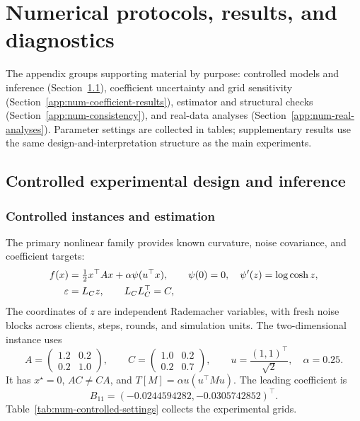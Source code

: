 \section{Numerical protocols, results, and diagnostics}
\label{app:num-details}

The appendix groups supporting material by purpose: controlled models and
inference (Section~\ref{app:num-design}), coefficient uncertainty and
grid sensitivity (Section~\ref{app:num-coefficient-results}), estimator
and structural checks (Section~\ref{app:num-consistency}), and real-data
analyses (Section~\ref{app:num-real-analyses}). Parameter settings are
collected in tables; supplementary results use the same design-and-interpretation
structure as the main experiments.

\subsection{Controlled experimental design and inference}
\label{app:num-design}

\subsubsection{Controlled instances and estimation}
\label{app:num-instance}

The primary nonlinear family provides known curvature, noise covariance,
and coefficient targets:
\begin{align}
 f(x)&=\tfrac12x^\top Ax+\alpha\psi(u^\top x),\qquad
 \psi(0)=0,\quad\psi'(z)=\log\cosh z,
 \label{eq:num-objective}\\
 \varepsilon&=L_Cz,\qquad L_CL_C^\top=C,
 \label{eq:num-noise}
\end{align}
The coordinates of $z$ are independent Rademacher variables, with fresh
noise blocks across clients, steps, rounds, and simulation units.
The two-dimensional instance uses
\begin{equation}
\label{eq:num-d2}
 A=\begin{pmatrix}1.2&0.2\\0.2&1.0\end{pmatrix},\qquad
 C=\begin{pmatrix}1.0&0.2\\0.2&0.7\end{pmatrix},\qquad
 u=\frac{(1,1)^\top}{\sqrt2},\quad\alpha=0.25.
\end{equation}
It has $x^\star=0$, $AC\ne CA$, and $T[M]=\alpha u(u^\top Mu)$.
The leading coefficient is
\[
B_{11}=(-0.0244594282,-0.0305742852)^\top.
\]
Table~\ref{tab:num-controlled-settings} collects the experimental grids.

